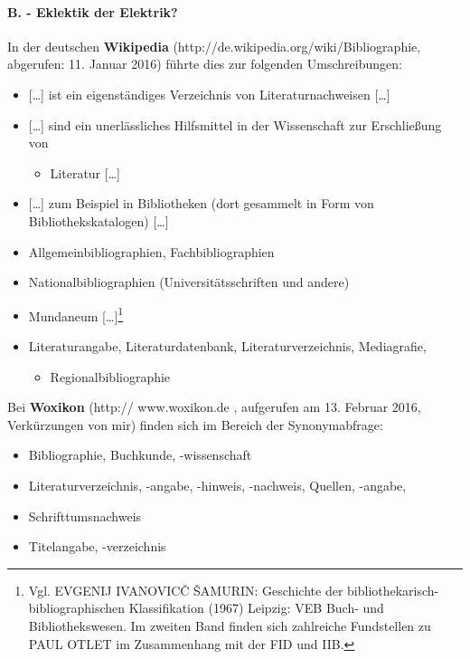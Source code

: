\documentclass[a4paper,
fontsize=11pt,
oneside,
numbers=noperiodatend,
parskip=half-,
bibliography=totoc,
final
]{scrartcl}
\providecommand{\tightlist}{%
  \setlength{\itemsep}{0pt}\setlength{\parskip}{0pt}}
\begin{document}
\paragraph{B. - Eklektik der
Elektrik?}\label{b.---eklektik-der-elektrik}

In der deutschen \textbf{Wikipedia}
(http://de.wikipedia.org/wiki/Bibliographie, abgerufen: 11. Januar 2016)
führte dies zur folgenden Umschreibungen:

\begin{itemize}
\item
  {[}\ldots{}{]} ist ein eigenständiges Verzeichnis von
  Literaturnachweisen {[}\ldots{}{]}
\item
  {[}\ldots{}{]} sind ein unerlässliches Hilfsmittel in der Wissenschaft
  zur Erschließung von

  \begin{itemize}
  \tightlist
  \item
    Literatur {[}\ldots{}{]}
  \end{itemize}
\item
  {[}\ldots{}{]} zum Beispiel in Bibliotheken (dort gesammelt in Form
  von Bibliothekskatalogen) {[}\ldots{}{]}
\item
  Allgemeinbibliographien, Fachbibliographien
\item
  Nationalbibliographien (Universitätsschriften und andere)
\item
  Mundaneum {[}\ldots{}{]}\footnote{Vgl. EVGENIJ IVANOVICČ ŠAMURIN:
    Geschichte der bibliothekarisch-bibliographischen Klassifikation
    (1967) Leipzig: VEB Buch- und Bibliothekswesen. Im zweiten Band
    finden sich zahlreiche Fundstellen zu PAUL OTLET im Zusammenhang mit
    der FID und IIB.}
\item
  Literaturangabe, Literaturdatenbank, Literaturverzeichnis,
  Mediagrafie,

  \begin{itemize}
  \tightlist
  \item
    Regionalbibliographie
  \end{itemize}
\end{itemize}

Bei \textbf{Woxikon} (http:// www.woxikon.de , aufgerufen am 13. Februar
2016, Verkürzungen von mir) finden sich im Bereich der Synonymabfrage:

\begin{itemize}
\item
  Bibliographie, Buchkunde, -wissenschaft
\item
  Literaturverzeichnis, -angabe, -hinweis, -nachweis, Quellen, -angabe,
\item
  Schrifttumsnachweis
\item
  Titelangabe, -verzeichnis
\end{itemize}
\end{document}
